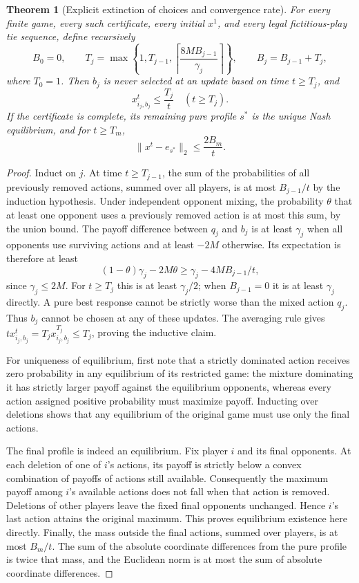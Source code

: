 \documentclass[11pt]{article}
\newtheorem{theorem}{Theorem}
\theoremstyle{definition}
\begin{document}
\begin{theorem}[Explicit extinction of choices and convergence rate]
For every finite game, every such certificate, every initial $x^1$, and every legal fictitious-play tie sequence, define recursively
\[
 B_0=0,\qquad
 T_j=\max\left\{1,T_{j-1},\left\lceil\frac{8M B_{j-1}}{\gamma_j}\right\rceil\right\},
 \qquad B_j=B_{j-1}+T_j,
\]
where $T_0=1$. Then $b_j$ is never selected at an update based on time $t\ge T_j$, and
\[
 x_{i_j,b_j}^t\le\frac{T_j}{t}\quad(t\ge T_j).
\]
If the certificate is complete, its remaining pure profile $s^*$ is the unique Nash equilibrium, and for $t\ge T_m$,
\[
 \|x^t-e_{s^*}\|_2\le\frac{2B_m}{t}.
\]
\end{theorem}
\begin{proof}
Induct on $j$. At time $t\ge T_{j-1}$, the sum of the probabilities of all previously removed actions, summed over all players, is at most $B_{j-1}/t$ by the induction hypothesis. Under independent opponent mixing, the probability $\theta$ that at least one opponent uses a previously removed action is at most this sum, by the union bound. The payoff difference between $q_j$ and $b_j$ is at least $\gamma_j$ when all opponents use surviving actions and at least $-2M$ otherwise. Its expectation is therefore at least
\[
 (1-\theta)\gamma_j-2M\theta
 \ge\gamma_j-4M B_{j-1}/t,
\]
since $\gamma_j\le 2M$. For $t\ge T_j$ this is at least $\gamma_j/2$; when $B_{j-1}=0$ it is at least $\gamma_j$ directly. A pure best response cannot be strictly worse than the mixed action $q_j$. Thus $b_j$ cannot be chosen at any of these updates. The averaging rule gives $t x_{i_j,b_j}^t=T_j x_{i_j,b_j}^{T_j}\le T_j$, proving the inductive claim.

For uniqueness of equilibrium, first note that a strictly dominated action receives zero probability in any equilibrium of its restricted game: the mixture dominating it has strictly larger payoff against the equilibrium opponents, whereas every action assigned positive probability must maximize payoff. Inducting over deletions shows that any equilibrium of the original game must use only the final actions.

The final profile is indeed an equilibrium. Fix player $i$ and its final opponents. At each deletion of one of $i$'s actions, its payoff is strictly below a convex combination of payoffs of actions still available. Consequently the maximum payoff among $i$'s available actions does not fall when that action is removed. Deletions of other players leave the fixed final opponents unchanged. Hence $i$'s last action attains the original maximum. This proves equilibrium existence here directly. Finally, the mass outside the final actions, summed over players, is at most $B_m/t$. The sum of the absolute coordinate differences from the pure profile is twice that mass, and the Euclidean norm is at most the sum of absolute coordinate differences.
\end{proof}
\end{document}

